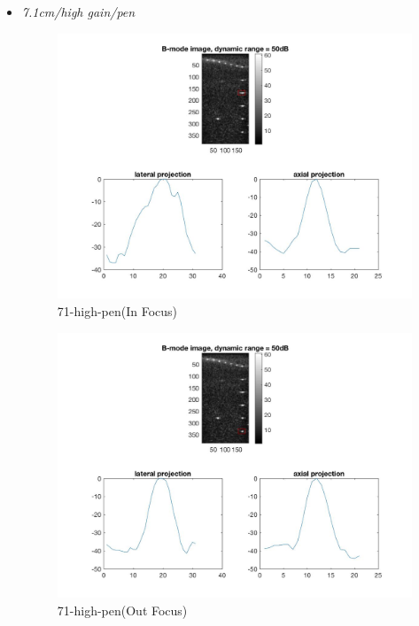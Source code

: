 \documentclass[12pts,a4paper]{article}
\begin{document}
\begin{itemize}
\item{\emph{7.1cm/high gain/pen}}
\begin{center}
\end{center}
\begin{figure}[h]
    \centering
    \includegraphics[width=1.0\textwidth]{img_hw1/71-high-pen1.jpg}
    \caption{71-high-pen(In Focus)}
    \label{fig:mesh1}
\end{figure}
\pagebreak
\begin{figure}[h]
    \centering
    \includegraphics[width=1.0\textwidth]{img_hw1/71-high-pen2.jpg}
    \caption{71-high-pen(Out Focus)}
    \label{fig:mesh1}
\end{figure}
\pagebreak

\end{itemize}
\end{document}
